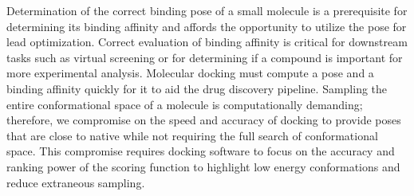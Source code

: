 \documentclass[journal=jcisd8,manuscript=article]{achemso}
\begin{document}
Determination of the correct binding pose of a small molecule is a prerequisite for determining its binding affinity and affords the opportunity to utilize the pose for lead optimization. Correct evaluation of binding affinity is critical for downstream tasks such as virtual screening or for determining if a compound is important for more experimental analysis. Molecular docking must compute a pose and a binding affinity quickly for it to aid the drug discovery pipeline. Sampling the entire conformational space of a molecule is computationally demanding; therefore, we compromise on the speed and accuracy of docking to provide poses that are close to native while not requiring the full search of conformational space. This compromise requires docking software to focus on the accuracy and ranking power of the scoring function to highlight low energy conformations and reduce extraneous sampling.
\end{document}
